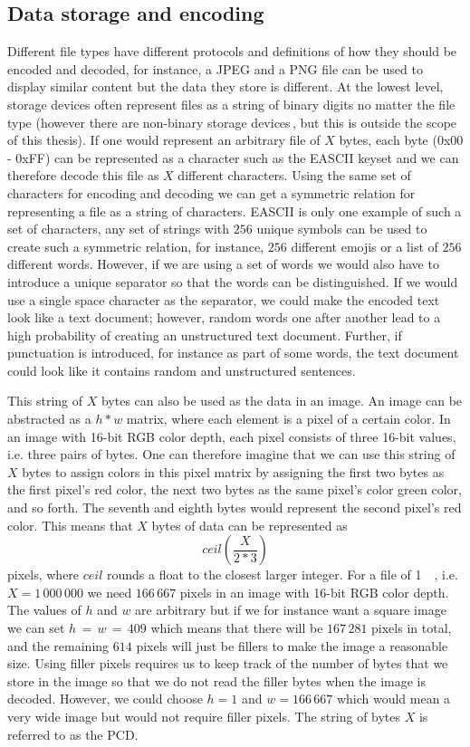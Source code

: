 \subsection{Data storage and encoding}
\label{sec:data_storage}
Different file types have different protocols and definitions of how they should be encoded and decoded, for instance, a JPEG and a PNG file can be used to display similar content but the data they store is different. At the lowest level, storage devices often represent files as a string of binary digits no matter the file type (however there are \mbox{non-binary} storage devices\,\cite{MultistateDataStorage2020}, but this is outside the scope of this thesis). If one would represent an arbitrary file of $X$ bytes, each byte (0x00 - 0xFF) can be represented as a character such as the \gls{EASCII} keyset and we can therefore decode this file as $X$ different characters. Using the same set of characters for encoding and decoding we can get a symmetric relation for representing a file as a string of characters. \gls{EASCII} is only one example of such a set of characters, any set of strings with $256$ unique symbols can be used to create such a symmetric relation, for instance, $256$ different emojis or a list of $256$ different words. However, if we are using a set of words we would also have to introduce a unique separator so that the words can be distinguished. If we would use a single space character as the separator, we could make the encoded text look like a text document; however, random words one after another lead to a high probability of creating an unstructured text document. Further, if punctuation is introduced, for instance as part of some words, the text document could look like it contains random and unstructured sentences.

This string of $X$ bytes can also be used as the data in an image. An image can be abstracted as a $h * w$ matrix, where each element is a pixel of a certain color. In an image with \mbox{16-bit} \gls{RGB} color depth, each pixel consists of three \mbox{16-bit} values, i.e. three pairs of bytes. One can therefore imagine that we can use this string of $X$ bytes to assign colors in this pixel matrix by assigning the first two bytes as the first pixel's red color, the next two bytes as the same pixel's color green color, and so forth. The seventh and eighth bytes would represent the second pixel's red color. This means that $X$ bytes of data can be represented as 
$$ceil(\frac{X}{2 * 3})$$ 
pixels, where $ceil$ rounds a float to the closest larger integer. For a file of \SI{1}{\mega\byte}, i.e. $X = 1\,000\,000$ we need $166\,667$ pixels in an image with \mbox{16-bit} \gls{RGB} color depth. The values of $h$ and $w$ are arbitrary but if we for instance want a square image we can set $ h\,=\,w\,=\,409$ which means that there will be $167\,281$ pixels in total, and the remaining $614$ pixels will just be fillers to make the image a reasonable size. Using filler pixels requires us to keep track of the number of bytes that we store in the image so that we do not read the filler bytes when the image is decoded. However, we could choose $h = 1$ and $w = 166\,667$ which would mean a very wide image but would not require filler pixels. The string of bytes $X$ is referred to as the \gls{PCD}.

